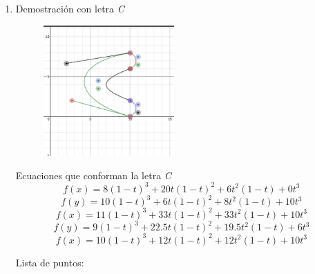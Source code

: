 \documentclass[11pt]{article}
\begin{document}
\begin{enumerate}
\item 
Demostración con letra \emph{C}
\begin{center}
	\begin{figure}[h!]
		\centering
		\includegraphics[width=50mm]{LetraCC.png}
	\end{figure}
\end{center}
Ecuaciones que conforman la letra \emph{C}
\begin{equation}
f(x) = 8(1-t)^3 + 20t(1-t)^2 + 6t^2(1-t)+ 0t^3 
\end{equation}
\begin{equation}
f(y) = 10(1-t)^3 + 6t(1-t)^2 + 8t^2(1-t)+ 10t^3 
\end{equation}
\begin{equation}
f(x) = 11(1-t)^3 + 33t(1-t)^2 +33t^2(1-t)+ 10t^3 
\end{equation}
\begin{equation}
f(y) = 9(1-t)^3 + 22.5t(1-t)^2 + 19.5t^2(1-t)+ 6t^3 
\end{equation}
\begin{equation}
f(x) = 10(1-t)^3 + 12t(1-t)^2 + 12t^2(1-t)+ 10t^3 
\end{equation}

Lista de puntos:


\end{enumerate}
\end{document}
